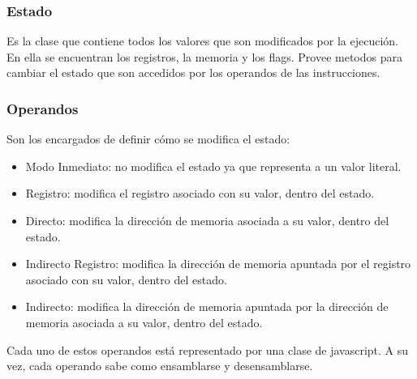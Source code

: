 \documentclass{article}
\begin{document}
\subsubsection*{Estado}
Es la clase que contiene todos los valores que son modificados por la ejecución. En ella se encuentran los registros, la memoria y los flags. Provee metodos para cambiar el estado que son accedidos por los operandos de las instrucciones.

\subsubsection*{Operandos}
Son los encargados de definir cómo se modifica el estado: 
\begin{itemize}
	\item Modo Inmediato: no modifica el estado ya que representa a un valor literal.
	\item Registro: modifica el registro asociado con su valor, dentro del estado.
	\item Directo: modifica la dirección de memoria asociada a su valor, dentro del estado.
	\item Indirecto Registro: modifica la dirección de memoria apuntada por el registro asociado con su valor, dentro del estado.
	\item Indirecto: modifica la dirección de memoria apuntada por la dirección de memoria asociada a su valor, dentro del estado.
\end{itemize}
Cada uno de estos operandos está representado por una clase de javascript. A su vez, cada operando sabe como ensamblarse y desensamblarse.
\end{document}
